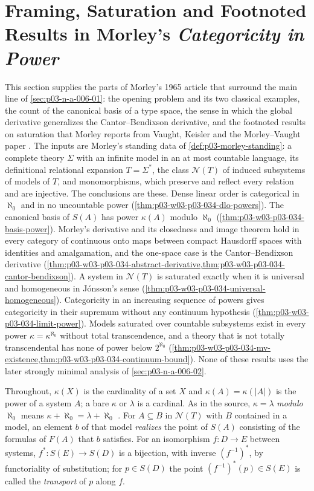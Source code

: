 \section{Framing, Saturation and Footnoted Results in Morley's \emph{Categoricity in Power}}
\label{sec:p03-w03-p03-034-morley-framing}

This section supplies the parts of Morley's 1965 article that surround the
main line of \cref{sec:p03-n-a-006-01}: the opening problem and its two
classical examples, the count of the canonical basis of a type space, the
sense in which the global derivative generalizes the Cantor--Bendixson
derivative, and the footnoted results on saturation that Morley reports
from Vaught, Keisler and the Morley--Vaught paper
\cite[pp.~514--516, 518, 520, 522, 535]{Morley1965}. The inputs are
Morley's standing data of \cref{def:p03-morley-standing}: a complete
theory \(\Sigma\) with an infinite model in an at most countable language,
its definitional relational expansion \(T=\Sigma^*\), the class
\(\mathcal N(T)\) of induced subsystems of models of \(T\), and
monomorphisms, which preserve and reflect every relation and are
injective. The conclusions are these. Dense linear order is categorical in
\(\aleph_0\) and in no uncountable power
(\cref{thm:p03-w03-p03-034-dlo-powers}). The canonical basis of
\(S(A)\) has power \(\kappa(A)\) modulo \(\aleph_0\)
(\cref{thm:p03-w03-p03-034-basis-power}). Morley's derivative and its
closedness and image theorem hold in every category of continuous onto
maps between compact Hausdorff spaces with identities and amalgamation,
and the one-space case is the Cantor--Bendixson derivative
(\cref{thm:p03-w03-p03-034-abstract-derivative,thm:p03-w03-p03-034-cantor-bendixson}).
A system in \(\mathcal N(T)\) is saturated exactly when it is universal and
homogeneous in Jónsson's sense
(\cref{thm:p03-w03-p03-034-universal-homogeneous}). Categoricity in an
increasing sequence of powers gives categoricity in their supremum
without any continuum hypothesis
(\cref{thm:p03-w03-p03-034-limit-power}). Models saturated over countable
subsystems exist in every power \(\kappa=\kappa^{\aleph_0}\) without total
transcendence, and a theory that is not totally transcendental has none of
power below \(2^{\aleph_0}\)
(\cref{thm:p03-w03-p03-034-mv-existence,thm:p03-w03-p03-034-continuum-bound}).
None of these results uses the later strongly minimal analysis of
\cref{sec:p03-n-a-006-02}.

Throughout, \(\kappa(X)\) is the cardinality of a set \(X\) and
\(\kappa(A)=\kappa(|A|)\) is the power of a system \(A\); a bare \(\kappa\)
or \(\lambda\) is a cardinal. As in the source, \(\kappa=\lambda\)
\emph{modulo} \(\aleph_0\) means \(\kappa+\aleph_0=\lambda+\aleph_0\)
\cite[p.~515]{Morley1965}. For \(A\subseteq B\) in \(\mathcal N(T)\)
with \(B\) contained in a model, an element \(b\) of that model
\emph{realizes} the point of \(S(A)\) consisting of the formulas of
\(F(A)\) that \(b\) satisfies. For an isomorphism \(f:D\to E\) between
systems, \(f^*:S(E)\to S(D)\) is a bijection, with inverse
\((f^{-1})^*\), by functoriality of substitution; for \(p\in S(D)\) the
point \((f^{-1})^*(p)\in S(E)\) is called the \emph{transport} of \(p\)
along \(f\).

